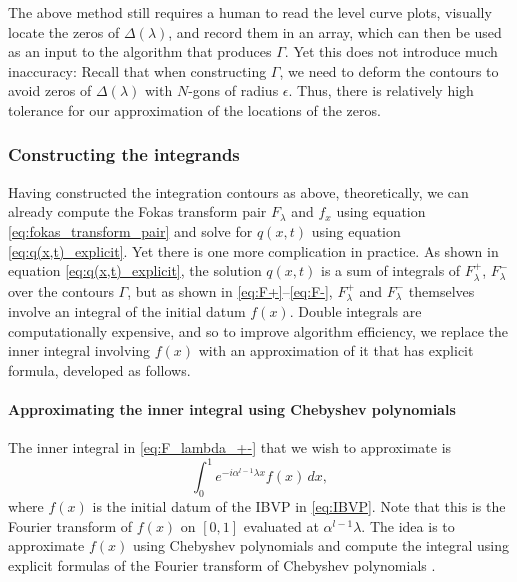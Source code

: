 \documentclass[12pt, oneside, a4paper]{article}
\begin{document}
The above method still requires a human to read the level curve plots, visually locate the zeros of $\Delta(\lambda)$, and record them in an array, which can then be used as an input to the algorithm that produces $\Gamma$. Yet this does not introduce much inaccuracy: Recall that when constructing $\Gamma$, we need to deform the contours to avoid zeros of $\Delta(\lambda)$ with $N$-gons of radius $\epsilon$. Thus, there is relatively high tolerance for our approximation of the locations of the zeros.

\subsubsection{Constructing the integrands}\label{sec:constructing_integrands}

Having constructed the integration contours as above, theoretically, we can already compute the Fokas transform pair $F_\lambda$ and $f_x$ using equation \eqref{eq:fokas_transform_pair} and solve for $q(x,t)$ using equation \eqref{eq:q(x,t)_explicit}.
Yet there is one more complication in practice. As shown in equation \eqref{eq:q(x,t)_explicit}, the solution $q(x,t)$ is a sum of integrals of $F_\lambda^+$, $F_\lambda^-$ over the contours $\Gamma$, but as shown in \eqref{eq:F+}--\eqref{eq:F-}, $F_\lambda^+$ and $F_\lambda^-$ themselves involve an integral of the initial datum $f(x)$. Double integrals are computationally expensive, and so to improve algorithm efficiency, we replace the inner integral involving $f(x)$ with an approximation of it that has explicit formula, developed as follows.

\paragraph{Approximating the inner integral using Chebyshev polynomials}\mbox{}\label{par:approximate_integral_chebyshev}

The inner integral in \eqref{eq:F_lambda_+-} that we wish to approximate is
\[\int_0^1 e^{-i\alpha^{l-1}\lambda x}f(x)\,dx,\]
where $f(x)$ is the initial datum of the IBVP in \eqref{eq:IBVP}.
Note that this is the Fourier transform of $f(x)$ on $[0,1]$ evaluated at $\alpha^{l-1}\lambda$.
The idea is to approximate $f(x)$ using Chebyshev polynomials and compute the integral using explicit formulas of the Fourier transform of Chebyshev polynomials \cite{Fokas2012}.
\end{document}
